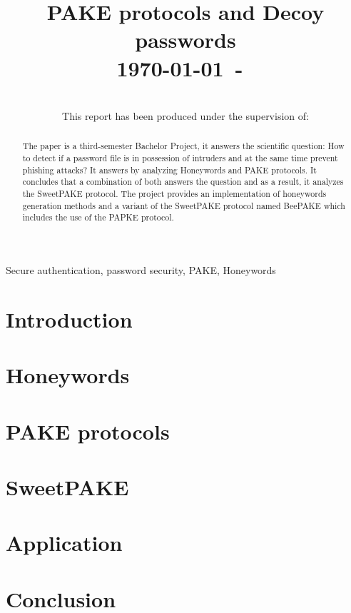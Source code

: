 \documentclass[conference, compsoc]{IEEEtran}
\begin{document}
\title{PAKE protocols and Decoy passwords\\
{\small \today~-~\currenttime}}

\author{
    \\
    This report has been produced under the supervision of:\\
    }

\maketitle

\begin{abstract}
The paper is a third-semester Bachelor Project, it answers the scientific
	question: How to detect if a password file is in possession of
	intruders and at the same time prevent phishing attacks? It answers by
	analyzing Honeywords and PAKE protocols. It concludes that a
	combination of both answers the question and as a result, it analyzes the
	SweetPAKE protocol. The project provides an implementation of
	honeywords generation methods and a variant of the SweetPAKE protocol
	named BeePAKE which includes the use of the PAPKE protocol.
\end{abstract}

\begin{IEEEkeywords}
Secure authentication, password security, PAKE, Honeywords
\end{IEEEkeywords}

\section{Introduction}


\section{Honeywords}


\section{PAKE protocols}


\section{SweetPAKE}


\section{Application}


\section{Conclusion}


\printbibliography
\end{document}
